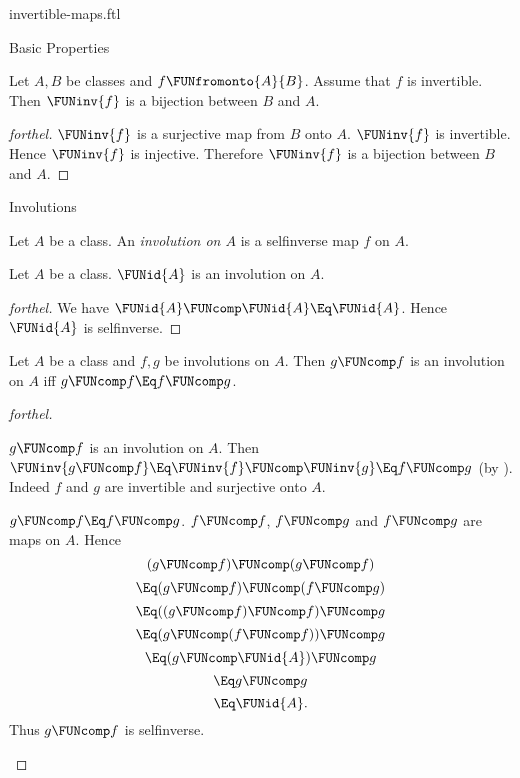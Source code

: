 \documentclass{stex}
\begin{document}
\begin{smodule}{invertible-maps.ftl}
\begin{sfragment}{Basic Properties}
  \begin{corollary}[forthel]
    Let $A, B$ be classes and $f \FUNfromonto{A}{B}$.
    Assume that $f$ is invertible.
    Then $\FUNinv{f}$ is a bijection between $B$ and $A$.
  \end{corollary}
  \begin{proof}[forthel]
    $\FUNinv{f}$ is a surjective map from $B$ onto $A$.
    $\FUNinv{f}$ is invertible.
    Hence $\FUNinv{f}$ is injective.
    Therefore $\FUNinv{f}$ is a bijection between $B$ and $A$.
  \end{proof}
\end{sfragment}

\begin{sfragment}{Involutions}
  \begin{definition}[forthel]
    Let $A$ be a class.
    An \emph{involution on $A$} is a selfinverse map $f$ on $A$.
  \end{definition}

  \begin{proposition}[forthel]
    Let $A$ be a class.
    $\FUNid{A}$ is an involution on $A$.
  \end{proposition}
  \begin{proof}[forthel]
    We have $\FUNid{A} \FUNcomp \FUNid{A} \Eq \FUNid{A}$.
    Hence $\FUNid{A}$ is selfinverse.
  \end{proof}

  \begin{proposition}[forthel]
    Let $A$ be a class and $f, g$ be involutions on $A$.
    Then $g \FUNcomp f$ is an involution on $A$ iff $g \FUNcomp f \Eq f \FUNcomp g$.
  \end{proposition}
  \begin{proof}[forthel]
    \begin{case}{$g \FUNcomp f$ is an involution on $A$.}
      Then $\FUNinv{g \FUNcomp f}
        \Eq \FUNinv{f} \FUNcomp \FUNinv{g}
        \Eq f \FUNcomp g$
      (by ).
      Indeed $f$ and $g$ are invertible and surjective onto $A$.
    \end{case}

    \begin{case}{$g \FUNcomp f \Eq f \FUNcomp g$.}
      $f \FUNcomp f$, $f \FUNcomp g$ and $f \FUNcomp g$ are maps on $A$.
      Hence
      \[  (g \FUNcomp f) \FUNcomp (g \FUNcomp f)       \]
      \[    \Eq (g \FUNcomp f) \FUNcomp (f \FUNcomp g)   \]
      \[    \Eq ((g \FUNcomp f) \FUNcomp f) \FUNcomp g   \]
      \[    \Eq (g \FUNcomp (f \FUNcomp f)) \FUNcomp g   \]
      \[    \Eq (g \FUNcomp \FUNid{A}) \FUNcomp g       \]
      \[    \Eq g \FUNcomp g                       \]
      \[    \Eq \FUNid{A}.                        \]
      Thus $g \FUNcomp f$ is selfinverse.
    \end{case}
  \end{proof}


\end{sfragment}
\end{smodule}
\end{document}
